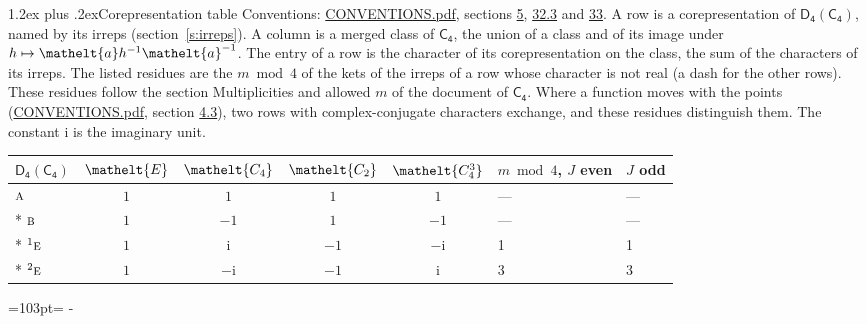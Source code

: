 \documentclass[10pt,a4paper]{article}
\makeatletter
\renewcommand\section{\@startsection{section}{1}{\z@}{-3ex plus -1ex minus -.2ex}%
  {1.2ex plus .2ex}{\normalfont\large\sffamily\bfseries\color{parttitle}}}
\newcommand{\needspace}[1]{\par\penalty-100\begingroup\dimen0=#1\relax\dimen2=\pagegoal
  \advance\dimen2-\pagetotal\ifdim\dimen0>\dimen2\relax\ifdim\dimen2>0pt\vfil\break\fi\fi
  \endgroup}
\numberwithin{equation}{section}
\newcommand{\eltfont}[1]{{\let\sigma\eltsigma\mathelt{#1}}}
\newcommand{\grp}[1]{\mathsf{#1}}
\newcommand{\irr}[1]{\text{\normalfont\scshape #1}}
\newcommand{\conjpair}[1]{{}^{#1}}
\newcommand{\cls}[1]{\eltfont{#1}}
\newcommand{\elt}[1]{\eltfont{#1}}
\newcommand{\iunit}{\mathrm{i}}
\makeatother
\begin{document}
\section{Corepresentation table}\label{s:character_table}
Conventions: \href{../../CONVENTIONS.pdf}{CONVENTIONS.pdf}, sections \href{../../../rotation/CONVENTIONS.pdf\#conv.5}{5}, \href{../../CONVENTIONS.pdf\#conv.32.3}{32.3} and \href{../../CONVENTIONS.pdf\#conv.33}{33}.
A row is a corepresentation of $\grp{D_{4}}(\grp{C_{4}})$, named by its irreps (section~\ref{s:irreps}). A column is a merged class of $\grp{C_{4}}$, the union of a class and of its image under $h \mapsto \elt{a} h^{-1} \elt{a}^{-1}$. The entry of a row is the character of its corepresentation on the class, the sum of the characters of its irreps.
\leavevmode\label{n:head.parity}The listed residues are the $m \bmod 4$ of the kets of the irreps of a row whose character is not real (a dash for the other rows). These residues follow the section Multiplicities and allowed $m$ of the document of \href{../../../rotation/data/pdf/C4.pdf}{$\grp{C_{4}}$}. Where a function moves with the points (\href{../../CONVENTIONS.pdf}{CONVENTIONS.pdf}, section \href{../../../rotation/CONVENTIONS.pdf\#conv.4.3}{4.3}), two rows with complex-conjugate characters exchange, and these residues distinguish them.
The constant $\iunit$ is the imaginary unit.
{\small\setlength{\tabcolsep}{4pt}\begin{longtable}{@{}lccccll@{}}\toprule
$\grp{D_{4}}(\grp{C_{4}})$ & $\cls{E}$ & $\cls{C_{4}}$ & $\cls{C_{2}}$ & $\cls{C_{4}^{3}}$ & $m \bmod 4$, $J$ even & $J$ odd\\\midrule\endhead
\bottomrule\endfoot\endlastfoot
$\irr{a}$ & $1$ & $1$ & $1$ & $1$ & --- & ---\\*
$\irr{b}$ & $1$ & $-1$ & $1$ & $-1$ & --- & ---\\*
$\conjpair{1}\irr{e}$ & $1$ & $\iunit{}$ & $-1$ & $-\iunit{}$ & 1 & 1\\*
$\conjpair{2}\irr{e}$ & $1$ & $-\iunit{}$ & $-1$ & $\iunit{}$ & 3 & 3\\
\bottomrule\end{longtable}}
\needspace{103pt}
\end{document}
